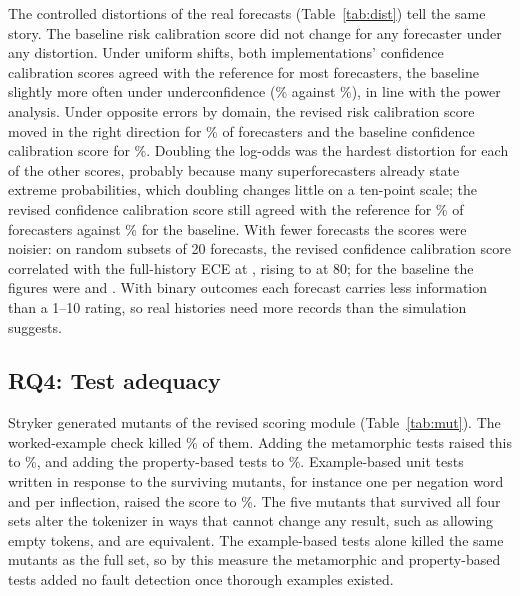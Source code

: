 \documentclass[12pt,a4paper]{article}
\newcommand{\tabnote}[1]{\par\vspace{2pt}{\footnotesize\raggedright #1\par}}
\begin{document}
The controlled distortions of the real forecasts (Table~\ref{tab:dist}) tell the same story. The baseline risk calibration score did not change for any forecaster under any distortion. Under uniform shifts, both implementations' confidence calibration scores agreed with the reference for most forecasters, the baseline slightly more often under underconfidence (\DistDTwoBaseCC\% against \DistDTwoRevCC\%), in line with the power analysis. Under opposite errors by domain, the revised risk calibration score moved in the right direction for \DistDThreeRevRC\% of forecasters and the baseline confidence calibration score for \DistDThreeBaseCC\%. Doubling the log-odds was the hardest distortion for each of the other scores, probably because many superforecasters already state extreme probabilities, which doubling changes little on a ten-point scale; the revised confidence calibration score still agreed with the reference for \DistDFourRevCC\% of forecasters against \DistDFourBaseCC\% for the baseline. With fewer forecasts the scores were noisier: on random subsets of 20 forecasts, the revised confidence calibration score correlated with the full-history ECE at \LenTwoZerorevisedcc{}, rising to \LenEightZerorevisedcc{} at 80; for the baseline the figures were \LenTwoZerobaselinecc{} and \LenEightZerobaselinecc{}. With binary outcomes each forecast carries less information than a 1--10 rating, so real histories need more records than the simulation suggests.

\begin{table}[t]
\caption{Share of \ReplayForecasters{} forecasters for whom a score moved in the direction indicated by the reference measure when their real forecasts were distorted (\%). Reference: ECE for D1, D2 and D4; domain-conditional calibration error for D3}\label{tab:dist}

\tabnote{CC, confidence calibration; RC, risk calibration; $p$, stated probability; ECE, expected calibration error.}
\end{table}

\subsection{RQ4: Test adequacy}

Stryker generated \MutTotal{} mutants of the revised scoring module (Table~\ref{tab:mut}). The worked-example check killed \MutworkedScore\% of them. Adding the metamorphic tests raised this to \MutmetamorphicScore\%, and adding the property-based tests to \MutpropertyScore\%. Example-based unit tests written in response to the surviving mutants, for instance one per negation word and per inflection, raised the score to \MutfullScore\%. The five mutants that survived all four sets alter the tokenizer in ways that cannot change any result, such as allowing empty tokens, and are equivalent. The example-based tests alone killed the same mutants as the full set, so by this measure the metamorphic and property-based tests added no fault detection once thorough examples existed.
\end{document}
